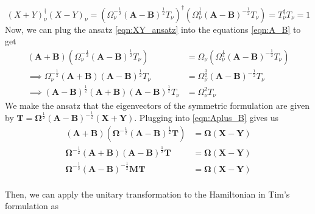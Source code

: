 \begin{tcolorbox}[colback=red!10!white, colframe=red!50!black, title=Exercise]
\begin{equation}
    \left({X} + {Y}\right)_\nu^\dagger \left({X} - {Y}\right)_\nu = \left({\Omega }_\nu^{-\frac{1}{2}} \left(\textbf{A}-\textbf{B}\right)^{\frac{1}{2}}T_\nu\right)^\dagger \left({\Omega }_\nu^{\frac{1}{2}} \left(\textbf{A}-\textbf{B}\right)^{-\frac{1}{2}}T_\nu\right) = T_\nu^\dagger T_\nu = {1}
\end{equation}
Now, we can plug the ansatz \ref{eqn:XY_ansatz} into the equations \ref{eqn:A_B} to get
\begin{equation}
\begin{split}
    \left(\textbf{A} + \textbf{B}\right) \left({\Omega }_\nu^{-\frac{1}{2}} \left(\textbf{A}-\textbf{B}\right)^{\frac{1}{2}}T_\nu\right) &= {\Omega }_\nu \left( {\Omega }_\nu^{\frac{1}{2}} \left(\textbf{A}-\textbf{B}\right)^{-\frac{1}{2}}T_\nu\right) \\
    \implies {\Omega }_\nu^{-\frac{1}{2}} \left(\textbf{A} + \textbf{B}\right) \left(\textbf{A}-\textbf{B}\right)^{\frac{1}{2}}T_\nu &= {\Omega }_\nu^{\frac{3}{2}} \left(\textbf{A}-\textbf{B}\right)^{-\frac{1}{2}}T_\nu \\
\implies \left(\textbf{A}-\textbf{B}\right)^{\frac{1}{2}} \left(\textbf{A} + \textbf{B}\right) \left(\textbf{A}-\textbf{B}\right)^{\frac{1}{2}}T_\nu &= {\Omega }_\nu^{2} T_\nu
\end{split}
\end{equation}
We make the ansatz that the eigenvectors of the symmetric formulation are given by $\textbf{T} = \boldsymbol{\Omega }^{\frac{1}{2}} \left(\textbf{A}-\textbf{B}\right)^{-\frac{1}{2}}\left(\textbf{X} + \textbf{Y}\right)$. Plugging into \ref{eqn:Aplus_B} gives us
\begin{align}
    \left(\textbf{A} + \textbf{B}\right) \left(\boldsymbol{\Omega }^{-\frac{1}{2}} \left(\textbf{A}-\textbf{B}\right)^{\frac{1}{2}}\bm{T}\right) &= \boldsymbol{\Omega } \left( \bm{X} - \bm{Y}\right) \\
\bm{\Omega}^{-\frac{1}{2}} \left(\textbf{A} + \textbf{B}\right) \left(\textbf{A}-\textbf{B}\right)^{\frac{1}{2}}\bm{T} &= \boldsymbol{\Omega } \left( \bm{X} - \bm{Y}\right) \\
\bm{\Omega}^{-\frac{1}{2}}\left(\textbf{A}-\textbf{B}\right)^{-\frac{1}{2}} \bm{M} \bm{T} &= \boldsymbol{\Omega } \left( \bm{X} - \bm{Y}\right) \\
\end{align}
\end{tcolorbox}
Then, we can apply the unitary transformation to the Hamiltonian in Tim's formulation as
